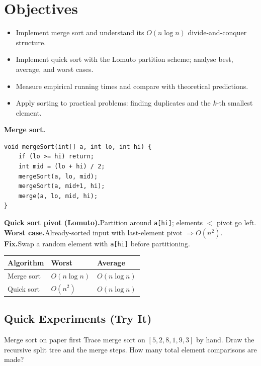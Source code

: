 \documentclass[11pt]{article}
\begin{document}
\labheader

\section*{Objectives}
\begin{itemize}[leftmargin=*,nosep]
  \item Implement merge sort and understand its $O(n \log n)$ divide-and-conquer structure.
  \item Implement quick sort with the Lomuto partition scheme; analyse best, average, and worst cases.
  \item Measure empirical running times and compare with theoretical predictions.
  \item Apply sorting to practical problems: finding duplicates and the $k$-th smallest element.
\end{itemize}

\begin{summary}
\textbf{Merge sort.}
\begin{lstlisting}
void mergeSort(int[] a, int lo, int hi) {
    if (lo >= hi) return;
    int mid = (lo + hi) / 2;
    mergeSort(a, lo, mid);
    mergeSort(a, mid+1, hi);
    merge(a, lo, mid, hi);
}
\end{lstlisting}

\textbf{Quick sort pivot (Lomuto).}\quad Partition around \texttt{a[hi]}; elements $<$ pivot go left.\\
\textbf{Worst case.}\quad Already-sorted input with last-element pivot $\Rightarrow O(n^2)$.\\
\textbf{Fix.}\quad Swap a random element with \texttt{a[hi]} before partitioning.

\bigskip
\begin{tabular}{@{}lll@{}}
\toprule
Algorithm & Worst & Average \\
\midrule
Merge sort & $O(n \log n)$ & $O(n \log n)$ \\
Quick sort & $O(n^2)$ & $O(n \log n)$ \\
\bottomrule
\end{tabular}
\end{summary}

\subsection*{Quick Experiments (Try It)}

\begin{tryit}{Merge sort on paper first}
Trace merge sort on $[5, 2, 8, 1, 9, 3]$ by hand.
Draw the recursive split tree and the merge steps.
How many total element comparisons are made?
\end{tryit}
\end{document}
